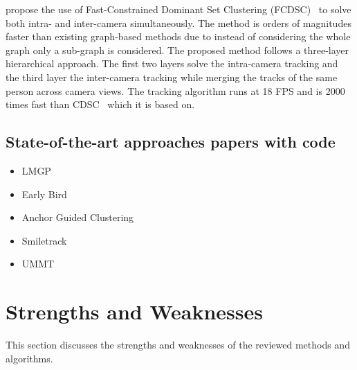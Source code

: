 \citeauthor{Tesfaye19} propose the use of Fast-Constrained Dominant Set Clustering (FCDSC)~\cite{Tesfaye19} to solve both intra- and inter-camera simultaneously. The method is orders of magnitudes faster than existing graph-based methods due to instead of considering the whole graph only a sub-graph is considered. The proposed method follows a three-layer hierarchical approach. The first two layers solve the intra-camera tracking and the third layer the inter-camera tracking while merging the tracks of the same person across camera views. The tracking algorithm runs at 18 FPS and is 2000 times fast than CDSC~\cite{Zemene16} which it is based on.

\subsection{State-of-the-art approaches papers with code}
\begin{itemize}
    \item LMGP~\cite{Nguyen22a}
    \item Early Bird~\cite{Teepe23}
    \item Anchor Guided Clustering~\cite{Huang23b}
    \item Smiletrack~\cite{Wang23}
    \item UMMT~\cite{Yang23}
\end{itemize}

\section{Strengths and Weaknesses}\label{sec:strengths_and_weaknesses}
This section discusses the strengths and weaknesses of the reviewed methods and algorithms.




